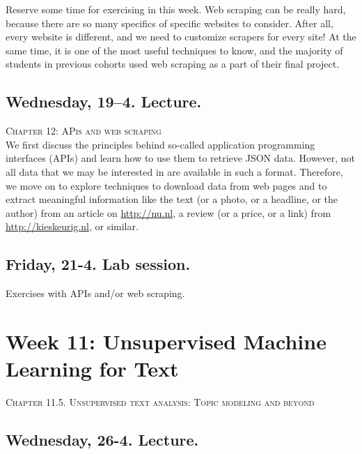 Reserve some time for exercising in this week. Web scraping can be really hard, because there are so many specifics of specific websites to consider. After all, every website is different, and we need to customize scrapers for every site! At the same time, it is one of the most useful techniques to know, and the majority of students in previous cohorts used web scraping as a part of their final project.

\subsection*{Wednesday, 19--4. Lecture.}
\textsc{ Chapter 12: APis and web scraping}\\

We first discuss the principles behind so-called application programming interfaces (APIs) and learn how to use them to retrieve JSON data. However, not all data that we may be interested in are available in such a format. Therefore, we move on to explore techniques to download data from web pages and to extract meaningful information like the text (or a photo, or a headline, or the author) from an article on \url{http://nu.nl}, a review (or a price, or a link) from \url{http://kieskeurig.nl}, or similar.



\subsection*{Friday, 21-4. Lab session.}

Exercises with APIs and/or web scraping.






\section*{Week 11: Unsupervised Machine Learning for Text}
\textsc{ Chapter 11.5. Unsupervised text analysis: Topic modeling and beyond}\\

\subsection*{Wednesday, 26-4. Lecture.}


